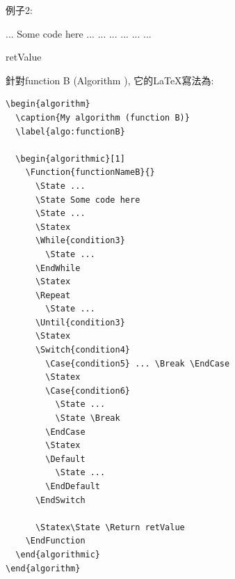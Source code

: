 
\newpage
例子2:
\begin{algorithm}
  \caption{My algorithm (function B)}
  \label{algo:functionB}

  \begin{algorithmic}[1]
      \State ...
      \State Some code here
      \State ...
      \Statex
        \State ...
      \EndWhile
      \Statex
      \Repeat
        \State ...
      \Statex
         ... \Break \EndCase
        \Statex
          \State ...
          \State \Break
        \EndCase
        \Statex
        \Default
          \State ...
        \EndDefault
      \EndSwitch

      \Statex\State \Return retValue
    \EndFunction
  \end{algorithmic}
\end{algorithm}

\newpage
針對function B (Algorithm ), 它的LaTeX寫法為:\\

\begin{DescriptionFrame}
  \begin{verbatim}
\begin{algorithm}
  \caption{My algorithm (function B)}
  \label{algo:functionB}

  \begin{algorithmic}[1]
    \Function{functionNameB}{}
      \State ...
      \State Some code here
      \State ...
      \Statex
      \While{condition3}
        \State ...
      \EndWhile
      \Statex
      \Repeat
        \State ...
      \Until{condition3}
      \Statex
      \Switch{condition4}
        \Case{condition5} ... \Break \EndCase
        \Statex
        \Case{condition6}
          \State ...
          \State \Break
        \EndCase
        \Statex
        \Default
          \State ...
        \EndDefault
      \EndSwitch

      \Statex\State \Return retValue
    \EndFunction
  \end{algorithmic}
\end{algorithm}
  \end{verbatim}
\end{DescriptionFrame}
